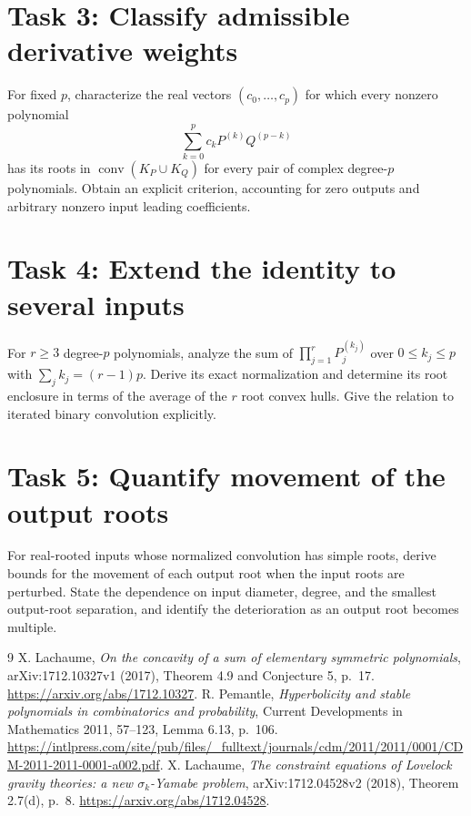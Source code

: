 \documentclass[11pt]{article}
\newcommand{\conv}{\operatorname{conv}}
\begin{document}
\section*{Task 3: Classify admissible derivative weights}
For fixed $p$, characterize the real vectors $(c_0,\ldots,c_p)$ for which
every nonzero polynomial
\[
 \sum_{k=0}^p c_kP^{(k)}Q^{(p-k)}
\]
has its roots in $\conv(K_P\cup K_Q)$ for every pair of complex
degree-$p$ polynomials. Obtain an explicit criterion, accounting for
zero outputs and arbitrary nonzero input leading coefficients.

\section*{Task 4: Extend the identity to several inputs}
For $r\geq3$ degree-$p$ polynomials, analyze the sum of
$\prod_{j=1}^rP_j^{(k_j)}$ over $0\leq k_j\leq p$ with
$\sum_j k_j=(r-1)p$. Derive its exact normalization and determine its
root enclosure in terms of the average of the $r$ root convex hulls.
Give the relation to iterated binary convolution explicitly.

\section*{Task 5: Quantify movement of the output roots}
For real-rooted inputs whose normalized convolution has simple roots,
derive bounds for the movement of each output root when the input roots
are perturbed. State the dependence on input diameter, degree, and
the smallest output-root separation, and identify the deterioration
as an output root becomes multiple.

\begin{thebibliography}{9}
X. Lachaume, \emph{On the concavity of a sum of elementary symmetric
polynomials}, arXiv:1712.10327v1 (2017), Theorem 4.9 and Conjecture 5,
p.~17. \url{https://arxiv.org/abs/1712.10327}.
R. Pemantle, \emph{Hyperbolicity and stable polynomials in combinatorics
and probability}, Current Developments in Mathematics 2011,
57--123, Lemma 6.13, p.~106.
\url{https://intlpress.com/site/pub/files/_fulltext/journals/cdm/2011/2011/0001/CDM-2011-2011-0001-a002.pdf}.
X. Lachaume, \emph{The constraint equations of Lovelock gravity theories:
a new $\sigma_k$-Yamabe problem}, arXiv:1712.04528v2 (2018),
Theorem 2.7(d), p.~8. \url{https://arxiv.org/abs/1712.04528}.
\end{thebibliography}
\end{document}
